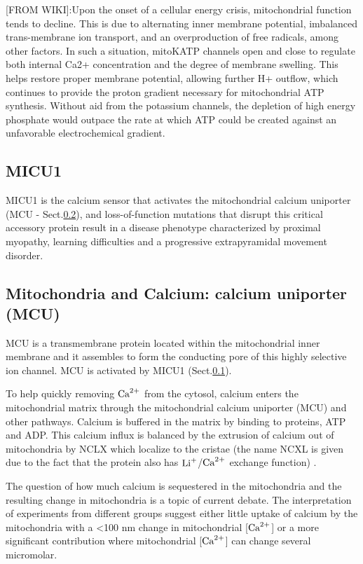 [FROM WIKI]:Upon the onset of a cellular energy crisis, mitochondrial function
tends to decline. This is due to alternating inner membrane potential,
imbalanced trans-membrane ion transport, and an overproduction of free radicals,
among other factors. In such a situation, mitoKATP channels open and close to
regulate both internal Ca2+ concentration and the degree of membrane swelling.
This helps restore proper membrane potential, allowing further H+ outflow, which
continues to provide the proton gradient necessary for mitochondrial ATP
synthesis. Without aid from the potassium channels, the depletion of high energy
phosphate would outpace the rate at which ATP could be created against an
unfavorable electrochemical gradient.

\subsection{MICU1}
\label{sec:MICU1}

MICU1 is the calcium sensor that activates the mitochondrial calcium uniporter
(MCU - Sect.\ref{sec:MCU}), and loss-of-function mutations that disrupt this
critical accessory protein result in a disease phenotype characterized by
proximal myopathy, learning difficulties and a progressive extrapyramidal
movement disorder.


\subsection{Mitochondria and Calcium: calcium uniporter (MCU)}
\label{sec:MCU}

MCU is a transmembrane protein located within the mitochondrial inner membrane
and it assembles to form the conducting pore of this highly selective ion
channel. MCU is activated by MICU1 (Sect.\ref{sec:MICU1}).

To help quickly removing ${\text{Ca}^{2+}}$ from the cytosol, calcium enters the
mitochondrial matrix through the mitochondrial calcium uniporter (MCU) and other
pathways. Calcium is buffered in the matrix by binding to proteins, ATP and ADP.
This calcium influx is balanced by the extrusion of calcium  out of mitochondria
by NCLX which localize to the cristae (the name NCXL is given due to the fact
that the protein also has $\Li$/${\text{Ca}^{2+}}$ exchange function) \citep{palty2010,
boyman2013}.

The question of how much calcium is sequestered in the mitochondria and the
resulting change in mitochondria is a topic of current debate.  The
interpretation of experiments from different groups suggest either little uptake
of calcium by the mitochondria with a <100 nm change in mitochondrial [${\text{Ca}^{2+}}$]
or a more significant contribution where mitochondrial [${\text{Ca}^{2+}}$] can change
several micromolar.

